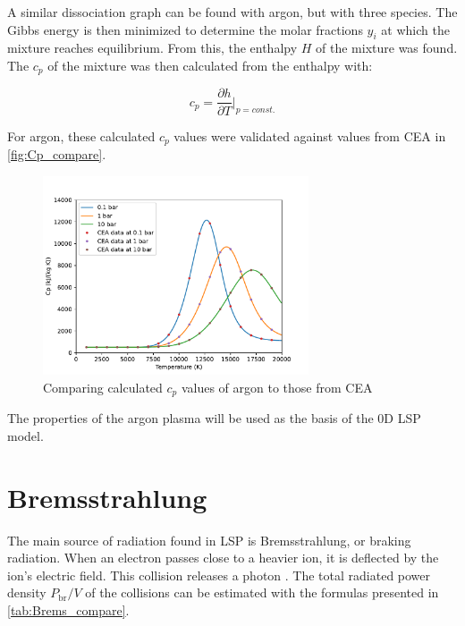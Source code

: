         A similar dissociation graph can be found with argon, but with three species. The Gibbs energy is then minimized to determine the molar fractions $y_i$ at which the mixture reaches equilibrium. From this, the enthalpy $H$ of the mixture was found. The $c_p$ of the mixture was then calculated from the enthalpy with:

        \begin{equation}
            c_p = \frac{\partial h}{\partial T}\bigg|_{p = const.}
        \end{equation}
        
        For argon, these calculated $c_p$ values were validated against values from CEA \cite{CEARUNRev4} in \autoref{fig:Cp_compare}.
        
        \begin{figure}[!ht]
            \centering
            \includegraphics[width=0.7\textwidth]{assets/2 models/Cp_compare.pdf}
            \caption{Comparing calculated $c_p$ values of argon to those from CEA}
            \label{fig:Cp_compare}
        \end{figure}

        The properties of the argon plasma will be used as the basis of the 0D LSP model.
    
    \section{Bremsstrahlung}
        
        The main source of radiation found in LSP is Bremsstrahlung, or braking radiation. When an electron passes close to a heavier ion, it is deflected by the ion's electric field. This collision releases a photon \autocite{glasstoneControlledThermonuclearReactions1975}. The total radiated power density $P_\mathrm{br}/V$ of the collisions can be estimated with the formulas presented in \autoref{tab:Brems_compare}.

